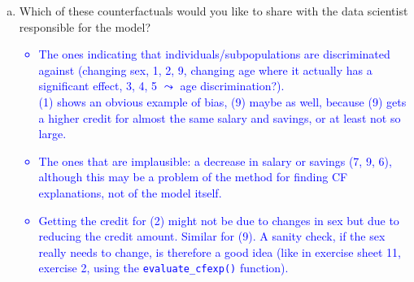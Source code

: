 {\begin{enumerate}[a)]
  \item Which of these counterfactuals would you like to share with the data scientist responsible for the model?
  \textcolor{blue}{
  \begin{itemize}
      \item The ones indicating that individuals/subpopulations are discriminated against (changing sex, 1, 2, 9, changing age where it actually has a significant effect, 3, 4, 5 $\leadsto$ age discrimination?). \\
      (1) shows an obvious example of bias, (9) maybe as well, because (9) gets a higher credit for almost the same salary and savings, or at least not so large.
      \item The ones that are implausible: a decrease in salary or savings (7, 9, 6), although this may be a problem of the method for finding CF explanations, not of the model itself.
      \item Getting the credit for (2) might not be due to changes in sex but due to reducing the credit amount. Similar for (9).
            A sanity check, if the sex really needs to change, is therefore a good idea (like in exercise sheet 11, exercise 2, using the \texttt{evaluate\_cfexp()} function).
  \end{itemize}
  }
  
\end{enumerate}
}
